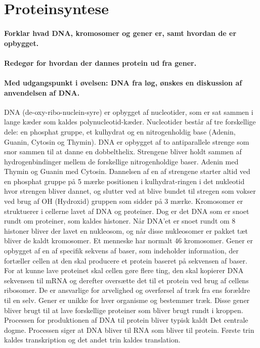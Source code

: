 \newpage
\part{Proteinsyntese}
\subsection*{Forklar hvad DNA, kromosomer og gener er, samt hvordan de er opbygget.}
\subsection*{Redegør for hvordan der dannes protein ud fra gener.}
\subsection*{Med udgangspunkt i øvelsen: DNA fra løg, ønskes en diskussion af anvendelsen af DNA.}
DNA (de-oxy-ribo-nuclein-syre) er opbygget af nucleotider, som er sat sammen i lange kæder som kaldes polynucleotid-kæder.  Nucleotider består af tre forskellige dele: en phosphat gruppe, et kulhydrat og en nitrogenholdig base (Adenin, Guanin, Cytosin og Thymin). DNA er opbygget af to antiparallele strenge som snor sammen til at danne en dobbelthelix. Strengene bliver holdt sammen af hydrogenbindinger mellem de forskellige nitrogenholdige baser. Adenin med Thymin og Guanin med Cytosin. Dannelsen af en af strengene starter altid ved en phosphat gruppe på 5 mærke positionen i kulhydrat-ringen i det nukleotid hvor strengen bliver dannet, og slutter ved at blive bundet til stregen som vokser ved brug af OH (Hydroxid) gruppen som sidder på 3 mærke.
Kromosomer er struktuerer i cellerne lavet af DNA og proteiner. Dog er det DNA som er snoet rundt om proteiner, som kaldes histoner. Når DNA’et er snoet rundt om 8 histoner bliver der lavet en nukleosom, og når disse nukleosomer er pakket tæt bliver de kaldt kromosomer. Et menneske har normalt 46 kromosomer. 
Gener er opbygget af en af specifik sekvens af baser, som indeholder information, der fortæller cellen at den skal producere et protein baseret på sekvensen af baser. For at kunne lave proteinet skal cellen gøre flere ting, den skal kopierer DNA sekvensen til mRNA og derefter oversætte det til et protein ved brug af cellens ribosomer. De er ansvarlige for arvelighed og overførsel af træk fra ens forældre til en selv. Gener er unikke for hver organisme og bestemmer træk. 
Disse gener bliver brugt til at lave forskellige proteiner som bliver brugt rundt i kroppen. Processen for produktionen af DNA til protein bliver typisk kaldt Det centrale dogme. Processen siger at DNA bliver til RNA som bliver til protein. Første trin kaldes transkription og det andet trin kaldes translation.
